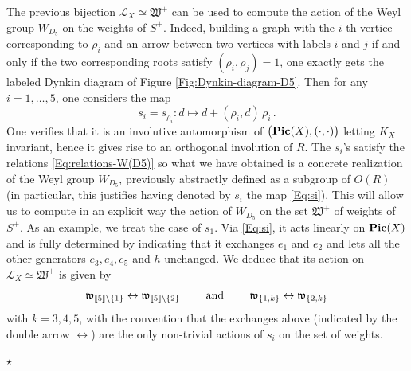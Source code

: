 \documentclass[11pt]{amsart}
\begin{document}
The previous bijection $\mathcal L_X\simeq \mathfrak W^+$ can be used to compute the action of the Weyl group $W_{D_5}$ on the weights of $S^+$. Indeed, building a graph with the $i$-th vertice corresponding to $\rho_i$ and an arrow between two vertices with labels $i$ and $j$ if and only if the two corresponding roots satisfy $(\rho_i,\rho_j)=1$, one exactly gets the labeled Dynkin diagram of Figure \ref{Fig:Dynkin-diagram-D5}.  Then for any $i = 1, \ldots,5$, one considers the map
\begin{equation}
\label{Eq:si}
s_i=s_{\rho_i} :  d\mapsto d+(\rho_i,d)\,\rho_i \, .
\end{equation}
One verifies that it is an involutive automorphism of $\big({\bf Pic}(X), (\cdot,\cdot)\big)$ letting 
$K_X$ invariant, hence it gives rise to an orthogonal involution of $R$. The $s_i$'s satisfy the relations \eqref{Eq:relations-W(D5)} so what we have obtained is a concrete realization of the Weyl group $W_{D_5}$, 
previously abstractly defined as a subgroup of $O(R)$ (in particular, this justifies  having denoted 
by $s_i$ the map \eqref{Eq:si}). 
 This will allow us to compute in an explicit way the action of $W_{D_5}$ on the set $\mathfrak W^+$ of weights of $S^+$. As an example, we treat the case of $s_1$. 
 Via \eqref{Eq:si}, it acts linearly on ${\bf Pic}(X)$ and is fully determined by indicating that it exchanges $e_1$ and $e_2$ and lets all the other generators $e_3,e_4,e_5$ and $h$ unchanged. We deduce that its action on $\mathcal L_X
\simeq  \mathfrak W^+$ is given by 
\begin{equation}
\label{Eq:echanges-si}
\mathfrak w_{[\hspace{-0.05cm}[5]\hspace{-0.05cm}] \setminus \{1\}}  
\leftrightarrow 
 \mathfrak w_{[\hspace{-0.05cm}[5]\hspace{-0.05cm}] \setminus \{2\}} 
\qquad \mbox{ and } \qquad 
\mathfrak w_{ \{1,k\}} 
\leftrightarrow 
\mathfrak w_{  \{2,k\}}
\end{equation}
 with $k=3,4,5$, with the convention that the exchanges above (indicated by the double arrow $\leftrightarrow $) are the only non-trivial actions of $s_i$ on the set of weights. 
\begin{center}
$\star$
\end{center}
\end{document}
